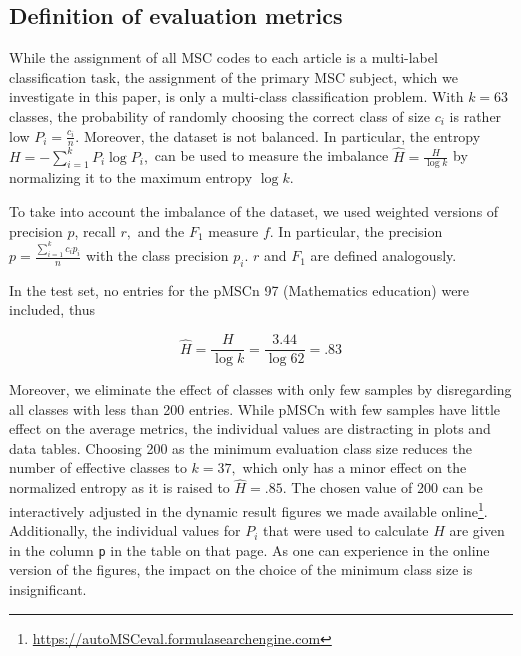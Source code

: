 \subsection{Definition of evaluation metrics}
While the assignment of all MSC codes to each article is a multi-label classification task, the assignment of the primary MSC subject, which we investigate in this paper, is only a multi-class classification problem.
With \(k = 63\) classes, the probability of randomly choosing the correct class of size \(c_{i}\) is rather low \(P_{i} = \frac{c_{i}}{n}.\)
Moreover, the dataset is not balanced.
In particular, the entropy \(
H = - \sum_{i = 1}^{k}P_{i}\log P_{i},
\) can be used to measure the imbalance \(\widehat{H} = \frac{H}{\log k}\) by normalizing it to the maximum entropy \(\log{k.}\)

To take into account the imbalance of the dataset, we used weighted versions of precision \(p\), recall \(r,\) and the \(F_{1}\) measure \(f\).
In particular, the precision \(p = \frac{\sum_{i = 1}^{k}c_{i}p_{i}}{n}\) with the class precision \(p_{i}\). \(r\) and \(F_{1}\) are defined analogously.

In the test set, no entries for the pMSCn 97 (Mathematics education) were included, thus

\[\widehat{H} = \frac{H}{\log k} = \frac{3.44}{\log 62} = .83\]

Moreover, we eliminate the effect of classes with only few samples by disregarding all classes with less than 200 entries.
While pMSCn with few samples have little effect on the average metrics, the individual values are distracting in plots and data tables.
Choosing 200 as the minimum evaluation class size reduces the number of effective classes to \(k = 37,\) which only has a minor effect on the normalized entropy as it is raised to \(\widehat{H} = .85.\)
The chosen value of 200 can be interactively adjusted in the dynamic result figures we made available online\footnote{\url{https://autoMSCeval.formulasearchengine.com}}.
Additionally, the individual values for \(P_{i}\) that were used to calculate \(H\) are given in the column \texttt{p} in the table on that page.
As one can experience in the online version of the figures, the impact on the choice of the minimum class size is insignificant.


